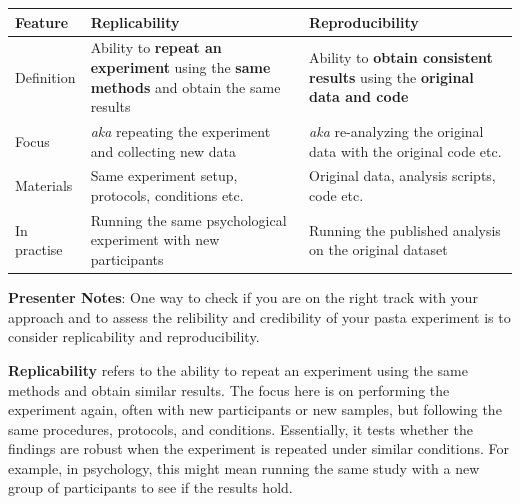 \documentclass[
  letterpaper,
  DIV=11,
  numbers=noendperiod]{scrartcl}
\newcounter{none} %
\begin{document}
{\def\LTcaptype{none} %
\begin{longtable}[]{@{}
  >{\raggedright\arraybackslash}p{}
  >{\raggedright\arraybackslash}p{}
  >{\raggedright\arraybackslash}p{}@{}}
\toprule\noalign{}
\begin{minipage}[b]{\linewidth}\raggedright
Feature
\end{minipage} & \begin{minipage}[b]{\linewidth}\raggedright
\textbf{Replicability}
\end{minipage} & \begin{minipage}[b]{\linewidth}\raggedright
\textbf{Reproducibility}
\end{minipage} \\
\midrule\noalign{}
\endhead
\bottomrule\noalign{}
\endlastfoot
Definition & Ability to \textbf{repeat an experiment} using the
\textbf{same methods} and obtain the same results & Ability to
\textbf{obtain consistent results} using the \textbf{original data and
code} \\
Focus & \emph{aka} repeating the experiment and collecting new data &
\emph{aka} re-analyzing the original data with the original code etc. \\
Materials & Same experiment setup, protocols, conditions etc. & Original
data, analysis scripts, code etc. \\
In practise & Running the same psychological experiment with new
participants & Running the published analysis on the original dataset \\
\end{longtable}
}

\textbf{Presenter Notes}: One way to check if you are on the right track
with your approach and to assess the relibility and credibility of your
pasta experiment is to consider replicability and reproducibility.

\textbf{Replicability} refers to the ability to repeat an experiment
using the same methods and obtain similar results. The focus here is on
performing the experiment again, often with new participants or new
samples, but following the same procedures, protocols, and conditions.
Essentially, it tests whether the findings are robust when the
experiment is repeated under similar conditions. For example, in
psychology, this might mean running the same study with a new group of
participants to see if the results hold.
\end{document}
